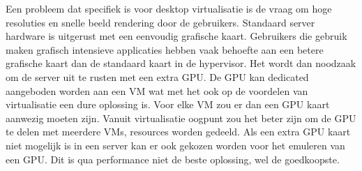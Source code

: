 Een probleem dat specifiek is voor desktop virtualisatie is de vraag om hoge resoluties en snelle beeld rendering door de gebruikers. Standaard server hardware is uitgerust met een eenvoudig grafische kaart. Gebruikers die gebruik maken grafisch intensieve applicaties hebben vaak behoefte aan een betere grafische kaart dan de standaard kaart in de hypervisor. Het wordt dan noodzaak om de server uit te rusten met een extra GPU. De GPU kan dedicated aangeboden worden aan een VM wat met het ook op de voordelen van virtualisatie een dure oplossing is. Voor elke VM zou er dan een GPU kaart aanwezig moeten zijn. Vanuit virtualisatie oogpunt zou het beter zijn om de GPU te delen met meerdere VMs, resources worden gedeeld. Als een extra GPU kaart niet mogelijk is in een server kan er ook gekozen worden voor het emuleren van een GPU. Dit is qua performance niet de beste oplossing, wel de goedkoopste.

